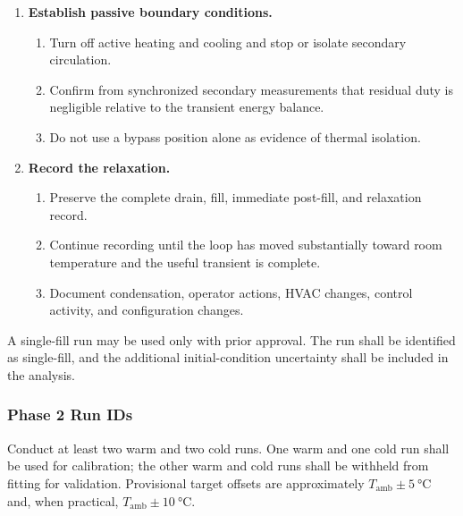 \documentclass[11pt]{article}
\newcommand{\Tamb}{T_{\mathrm{amb}}}
\begin{document}
\begin{enumerate}
    \item \textbf{Establish passive boundary conditions.}
    \begin{enumerate}
        \item Turn off active heating and cooling and stop or isolate secondary circulation.
        \item Confirm from synchronized secondary measurements that residual duty is negligible relative to the transient energy balance.
        \item Do not use a bypass position alone as evidence of thermal isolation.
    \end{enumerate}

    \item \textbf{Record the relaxation.}
    \begin{enumerate}
        \item Preserve the complete drain, fill, immediate post-fill, and relaxation record.
        \item Continue recording until the loop has moved substantially toward room temperature and the useful transient is complete.
        \item Document condensation, operator actions, HVAC changes, control activity, and configuration changes.
    \end{enumerate}
\end{enumerate}

A single-fill run may be used only with prior approval. The run shall be identified as single-fill, and the additional initial-condition uncertainty shall be included in the analysis.

\subsubsection{Phase 2 Run IDs}

Conduct at least two warm and two cold runs. One warm and one cold run shall be used for calibration; the other warm and cold runs shall be withheld from fitting for validation. Provisional target offsets are approximately $\Tamb\pm\SI{5}{\degreeCelsius}$ and, when practical, $\Tamb\pm\SI{10}{\degreeCelsius}$.
\end{document}
